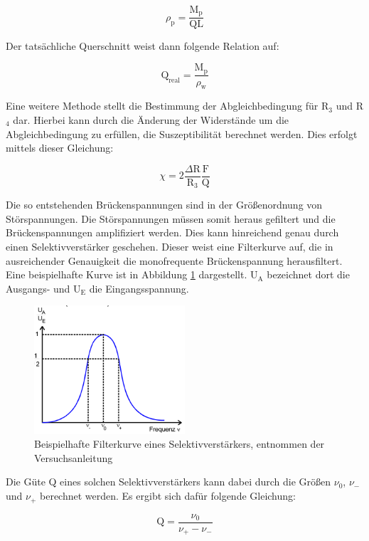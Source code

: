 \begin{equation}
  \rho_\text{p} = \frac{\text{M}_\text{p}}{\text{Q} \text{L}}
\end{equation}

Der tatsächliche Querschnitt weist dann folgende Relation auf:

\begin{equation}
  \text{Q}_\text{real} = \frac{\text{M}_\text{p}}{\rho_\text{w}}
  \label{eqn:qreal}
\end{equation}

Eine weitere Methode stellt die Bestimmung der Abgleichbedingung für R$_3$ und R$_4$ dar.
Hierbei kann durch die Änderung der Widerstände um die Abgleichbedingung zu erfüllen, die Suszeptibilität berechnet werden.
Dies erfolgt mittels dieser Gleichung:

\begin{equation}
  \chi = 2 \frac{\Delta \text{R}}{\text{R}_3} \frac{\text{F}}{\text{Q}}
  \label{eqn:chi2}
\end{equation}

Die so entstehenden Brückenspannungen sind in der Größenordnung von Störspannungen.
Die Störspannungen müssen somit heraus gefiltert und die Brückenspannungen amplifiziert werden.
Dies kann hinreichend genau durch einen Selektivverstärker geschehen.
Dieser weist eine Filterkurve auf, die in ausreichender Genauigkeit die monofrequente Brückenspannung herausfiltert.
Eine beispielhafte Kurve ist in Abbildung \ref{fig:theofilterkurve} dargestellt.
U$_\text{A}$ bezeichnet dort die Ausgangs- und U$_\text{E}$ die Eingangsspannung.

\begin{figure}
  \centering
  \includegraphics[width=0.5\textwidth]{images/theodiefilterkurve.png}
  \caption{Beispielhafte Filterkurve eines Selektivverstärkers, entnommen der Versuchsanleitung\cite[182]{sample}}
  \label{fig:theofilterkurve}
\end{figure}

Die Güte Q eines solchen Selektivverstärkers kann dabei durch die Größen $\nu_0$, $\nu_-$ und $\nu_+$ berechnet werden.
Es ergibt sich dafür folgende Gleichung:

\begin{equation}
  \text{Q} = \frac{\nu_0}{\nu_+ - \nu_-}
  \label{eqn:Güte}
\end{equation}

